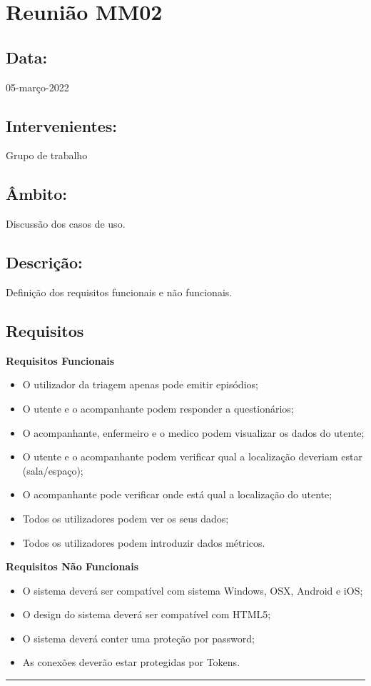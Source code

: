 
\section{Reunião MM02}\label{reuniaoMM02}

\subsection*{Data:}
05-março-2022

\subsection*{Intervenientes:}
Grupo de trabalho

\subsection*{Âmbito:}
Discussão dos casos de uso.

\subsection*{Descrição:}
Definição dos requisitos funcionais e não funcionais.

\subsection*{Requisitos}

\textbf{Requisitos Funcionais}

\begin{itemize}
	\item O utilizador da triagem apenas pode emitir episódios;
	\item O utente e o acompanhante podem responder a questionários;
	\item O acompanhante, enfermeiro e o medico podem visualizar os dados do utente;
	\item O utente e o acompanhante podem verificar qual a localização deveriam estar (sala/espaço);
	\item O acompanhante pode verificar onde está qual a localização do utente;
	\item Todos os utilizadores podem ver os seus dados;
	\item Todos os utilizadores podem introduzir dados métricos.
\end{itemize}

\textbf{Requisitos Não Funcionais}

\begin{itemize}
	\item O sistema deverá ser compatível com sistema Windows, OSX, Android e iOS;
	\item O design do sistema deverá ser compatível com HTML5;
	\item O sistema deverá conter uma proteção por password;
	\item As conexões deverão estar protegidas por Tokens.
\end{itemize}

\noindent \rule{\linewidth}{0.4pt}
\newline

